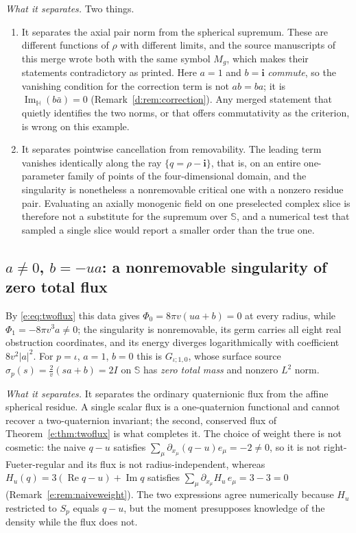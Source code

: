 \documentclass[11pt,a4paper]{article}
\numberwithin{equation}{section}
\theoremstyle{definition}
\theoremstyle{remark}
\theoremstyle{plain}
\newcommand{\HH}{\mathbb H}
\newcommand{\SSS}{\mathbb S}
\DeclareMathOperator{\Rea}{Re}
\DeclareMathOperator{\Ima}{Im}
\newcommand{\ImH}{\Ima_{\HH}}
\newcommand{\Sp}{S_{p}}
\newcommand{\abs}[1]{\lvert #1\rvert}
\begin{document}
\emph{What it separates.} Two things.
\begin{enumerate}[label=\textup{(\roman*)}]
\item It separates the axial pair norm from the spherical supremum. These
are different functions of $\rho$ with different limits, and the source
manuscripts of this merge wrote both with the same symbol $M_g$, which
makes their statements contradictory as printed. Here $a=1$ and
$b=\mathbf i$ \emph{commute}, so the vanishing condition for the correction
term is not $ab=ba$; it is $\ImH(b\bar a)=0$
(Remark~\ref{d:rem:correction}). Any merged statement that quietly
identifies the two norms, or that offers commutativity as the criterion, is
wrong on this example.
\item It separates pointwise cancellation from removability. The leading
term vanishes identically along the ray $\{q=\rho-\mathbf i\}$, that is, on
an entire one-parameter family of points of the four-dimensional domain,
and the singularity is nonetheless a nonremovable critical one with a
nonzero residue pair. Evaluating an axially monogenic field on one
preselected complex slice is therefore not a substitute for the supremum
over $\SSS$, and a numerical test that sampled a single slice would report
a smaller order than the true one.
\end{enumerate}

\subsection{$a\ne0$, $b=-ua$: a nonremovable singularity of zero total
flux}
\label{f:ex:zero-flux}

By \eqref{e:eq:twoflux} this data gives
$\Phi_0=8\pi v(ua+b)=0$ at every radius, while
$\Phi_1=-8\pi v^3a\ne0$; the singularity is nonremovable, its germ carries
all eight real obstruction coordinates, and its energy diverges
logarithmically with coefficient $8v^2\abs a^2$. For $p=\iota$, $a=1$,
$b=0$ this is $G_{\iota;1,0}$, whose surface source
$\sigma_p(s)=\frac2v(sa+b)=2I$ on $\SSS$ has \emph{zero total mass} and
nonzero $L^2$ norm.

\emph{What it separates.} It separates the ordinary quaternionic flux from
the affine spherical residue. A single scalar flux is a one-quaternion
functional and cannot recover a two-quaternion invariant; the second,
conserved flux of Theorem~\ref{e:thm:twoflux} is what completes it. The
choice of weight there is not cosmetic: the naive $q-u$ satisfies
$\sum_\mu\partial_{x_\mu}(q-u)e_\mu=-2\ne0$, so it is not
right-Fueter-regular and its flux is not radius-independent, whereas
$H_u(q)=3(\Rea q-u)+\Ima q$ satisfies
$\sum_\mu\partial_{x_\mu}H_u\,e_\mu=3-3=0$
(Remark~\ref{e:rem:naiveweight}). The two expressions agree numerically
because $H_u$ restricted to $\Sp$ equals $q-u$, but the moment
presupposes knowledge of the density while the flux does not.
\end{document}
